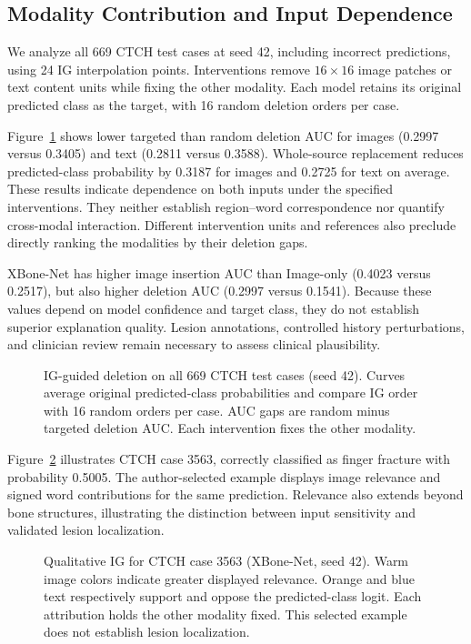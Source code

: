 \subsection{Modality Contribution and Input Dependence}
We analyze all 669 CTCH test cases at seed 42, including incorrect predictions, using 24 IG interpolation points. Interventions remove $16\times16$ image patches or text content units while fixing the other modality. Each model retains its original predicted class as the target, with 16 random deletion orders per case.

Figure~\ref{fig:ig} shows lower targeted than random deletion AUC for images (0.2997 versus 0.3405) and text (0.2811 versus 0.3588). Whole-source replacement reduces predicted-class probability by 0.3187 for images and 0.2725 for text on average. These results indicate dependence on both inputs under the specified interventions. They neither establish region--word correspondence nor quantify cross-modal interaction. Different intervention units and references also preclude directly ranking the modalities by their deletion gaps.

XBone-Net has higher image insertion AUC than Image-only (0.4023 versus 0.2517), but also higher deletion AUC (0.2997 versus 0.1541). Because these values depend on model confidence and target class, they do not establish superior explanation quality. Lesion annotations, controlled history perturbations, and clinician review remain necessary to assess clinical plausibility.

\begin{figure}[t]
\centering

\caption{IG-guided deletion on all 669 CTCH test cases (seed 42). Curves average original predicted-class probabilities and compare IG order with 16 random orders per case. AUC gaps are random minus targeted deletion AUC. Each intervention fixes the other modality.}
\label{fig:ig}
\end{figure}


Figure~\ref{fig:ig_case} illustrates CTCH case 3563, correctly classified as finger fracture with probability 0.5005. The author-selected example displays image relevance and signed word contributions for the same prediction. Relevance also extends beyond bone structures, illustrating the distinction between input sensitivity and validated lesion localization.

\begin{figure}[t]
\centering

\caption{Qualitative IG for CTCH case 3563 (XBone-Net, seed 42). Warm image colors indicate greater displayed relevance. Orange and blue text respectively support and oppose the predicted-class logit. Each attribution holds the other modality fixed. This selected example does not establish lesion localization.}
\label{fig:ig_case}
\end{figure}

